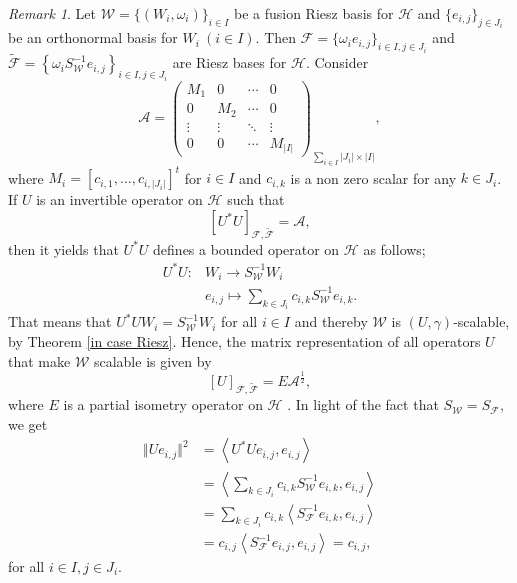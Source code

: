 \documentclass[sn-mathphys-num]{sn-jnl}%
\theoremstyle{definition}
\theoremstyle{remark}
\newtheorem{Remark}[theorem]{Remark}
\numberwithin{equation}{section}
\begin{document}
\begin{Remark}
Let $\mathcal{W}=\{(W_{i},\omega_{i})\}_{i \in I} $ be a fusion Riesz basis for $\mathcal {H}$ and $\{e_{i,j}\}_{j \in J_{i}}$ be an orthonormal basis for $W_{i}~ (i\in I)$. Then $\mathcal {F}=\{\omega_{i}e_{i,j}\}_{i \in I,j \in J_{i}}$ and $\widetilde{\mathcal {F}}=\left\lbrace \omega_{i}S_{\mathcal{W}}^{-1}e_{i,j}\right\rbrace _{i \in I,j \in J_{i}}$ are Riesz bases for $\mathcal{H}$. Consider 
\begin{equation*}
\mathcal{A}={\left(\begin{matrix}
M_{1} &  0   & \cdots & 0 \\
 0  &  M_{2}  &  \cdots & 0 \\
 \vdots & \vdots &   \ddots &  \vdots \\
 0 & 0  & \cdots & M_{|I|}
\end{matrix}\right)}_{\sum_{i \in I}|J_{i}|\times |I|},
\end{equation*}
where $M_{i}=\left[ c_{i,1}, \ldots ,c_{i,|J_{i}|} \right] ^t$ for $i \in I$ and $c_{i,k}$ is a non zero scalar for any $k \in J_{i}$. If $U$ is an invertible operator on $\mathcal{H}$ such that
\begin{equation*}
\left[U^*U\right]_{\mathcal {F},\widetilde{\mathcal {F}}}=\mathcal{A},
\end{equation*}
then it yields that $U^*U$ defines a bounded operator on $\mathcal{H}$ as follows;
\begin{align*}
U^*U:& W_{i} \rightarrow S_{\mathcal{W}}^{-1}W_{i}
\\&e_{i,j}\mapsto \sum_{k \in J_{i}}c_{i,k}S_{\mathcal{W}}^{-1}e_{i,k}.
\end{align*}
That means that $U^*UW_{i}=S_{\mathcal{W}}^{-1}W_{i}$ for all $i \in I$ and thereby $\mathcal{W}$ is $(U,\gamma)$-scalable, by Theorem \ref{in case Riesz}. Hence, the matrix representation of all operators $U$ that make $\mathcal{W}$ scalable is given by
\begin{equation*}
\left[ U \right]_{\mathcal {F},\widetilde{\mathcal {F}}} =E\mathcal{A}^{\frac{1}{2}},
\end{equation*}
where $E$ is a partial isometry operator on $\mathcal{H}$ \cite{Furuta}. In light of the fact that $S_{\mathcal{W}}=S_{\mathcal{F}},$ we get
\begin{align*}
\Vert Ue_{i,j} \Vert^{2}&=\left\langle U^*Ue_{i,j},e_{i,j} \right\rangle  
\\&=\left\langle \sum_{k \in J_{i}}c_{i,k}S_{\mathcal{W}}^{-1}e_{i,k},e_{i,j}\right\rangle 
\\&=\sum_{k \in J_{i}}c_{i,k}\left\langle S_{\mathcal{F}}^{-1}e_{i,k},e_{i,j}\right\rangle 
\\&=c_{i,j}\left\langle S_{\mathcal{F}}^{-1}e_{i,j},e_{i,j}\right\rangle =c_{i,j},
\end{align*}
for all $i \in I, j \in J_{i}.$
\end{Remark}
\end{document}
